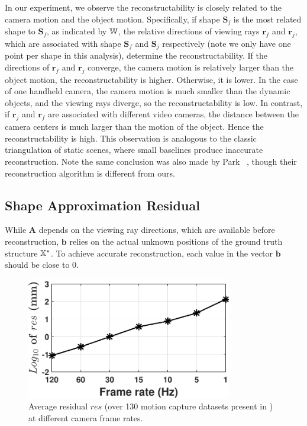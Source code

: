 In our experiment, we observe the reconstructability is closely related to the camera motion and the object motion. 
Specifically, if shape $\mathbf{S}_j$ is the most related shape to $\mathbf{S}_f$, as indicated by $\mathbb W$, the relative directions of viewing rays $\mathbf{r}_f$ and $\mathbf{r}_j$, which are associated with shape $\mathbf{S}_f$ and $\mathbf{S}_j$ respectively (note we only have one point per shape in this analysis), determine the reconstructability. If the directions of $\mathbf{r}_f$ and $\mathbf{r}_j$ converge, \ie the camera motion is relatively larger than the object motion, the reconstructability is higher. Otherwise, it is lower. 
In the case of one handheld camera, the camera motion is much smaller than the dynamic objects,  and the viewing rays diverge, so the reconstructability is low. In contrast, if $\mathbf{r}_j$ and $\mathbf{r}_f$ are associated with different video cameras, the distance between the camera centers is much larger than the motion of the object. Hence the reconstructability is high.
This observation is analogous to the classic triangulation of static scenes, where small baselines produce inaccurate reconstruction. Note the same conclusion was also made by Park \etal~\cite{park20153d}, though their reconstruction algorithm is different from ours.



\subsection{Shape Approximation Residual} \label{sec:shape_approximation}
While $\mathbf{A}$ depends on the viewing ray directions, which are available before reconstruction, $\mathbf{b}$ relies on the actual unknown positions of the ground truth structure $\mathbb X^*$. To achieve accurate reconstruction, each value in the vector $\mathbf{b}$ should be close to 0. 

\begin{figure}
\centering
\includegraphics[width=0.80\textwidth]{chapter5/resource/residual.pdf}
\caption{Average residual $res$ (over 130 motion capture datasets present in \cite{cg-2007-2}) at different camera frame rates.}
\label{fig:residual}
\end{figure}

